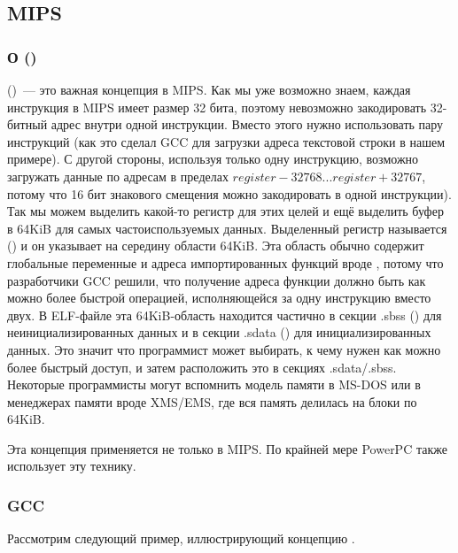 \subsection{MIPS}

\subsubsection{О  ()}
\label{MIPS_GP}

 ()~--- это важная концепция в MIPS.
Как мы уже возможно знаем, каждая инструкция в MIPS имеет размер 32 бита, поэтому невозможно
закодировать 32-битный адрес внутри одной инструкции. Вместо этого нужно использовать пару инструкций
(как это сделал GCC для загрузки адреса текстовой строки в нашем примере).
С другой стороны, используя только одну инструкцию, 
возможно загружать данные по адресам в пределах $register-32768...register+32767$, потому что 16 бит
знакового смещения можно закодировать в одной инструкции).
Так мы можем выделить какой-то регистр для этих целей и ещё выделить буфер в 64KiB для самых 
частоиспользуемых данных.
Выделенный регистр называется  () и он указывает на середину
области 64KiB.
Эта область обычно содержит глобальные переменные и адреса импортированных функций вроде \printf,
потому что разработчики GCC решили, что получение адреса функции должно быть как можно более быстрой операцией,
исполняющейся за одну инструкцию вместо двух.
В ELF-файле эта 64KiB-область находится частично в секции .sbss () для неинициализированных
данных и в секции .sdata () для инициализированных данных.
Это значит что программист может выбирать, к чему нужен как можно более быстрый доступ, и затем расположить
это в секциях .sdata/.sbss.
Некоторые программисты  могут вспомнить модель памяти в MS-DOS  
или в менеджерах памяти вроде XMS/EMS, где вся память делилась на блоки по 64KiB.

Эта концепция применяется не только в MIPS. По крайней мере PowerPC также использует эту технику.

\subsubsection{\Optimizing GCC}

Рассмотрим следующий пример, иллюстрирующий концепцию .

